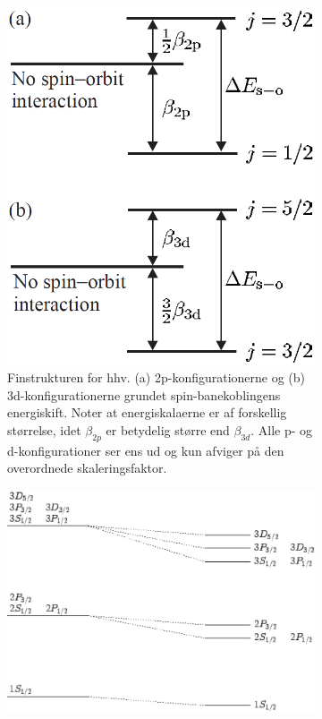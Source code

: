 \begin{figure}[!h]
    \centering
    \begin{subfigure}[t]{0.40\textwidth}
        \centering
        \includegraphics[width=.83\textwidth]{Q10/images/SpinOrbitCouplingHydrogenSplittings.PNG}
        \caption{Finstrukturen for hhv. (a) 2p-konfigurationerne og (b) 3d-konfigurationerne grundet spin-banekoblingens energiskift. Noter at energiskalaerne er af forskellig størrelse, idet $\beta_{2p}$ er betydelig større end $\beta_{3d}$. Alle p- og d-konfigurationer ser ens ud og kun afviger på den overordnede skaleringsfaktor.}
        \label{fig:Q10_FinstrukturForHydrogen1}
    \end{subfigure}
    \hfill
    \begin{subfigure}[t]{0.53\textwidth}
        \centering
        \includegraphics[width=\textwidth]{Q10/images/FineStructureOfHydrogen.PNG}

\end{subfigure}
\end{figure}

